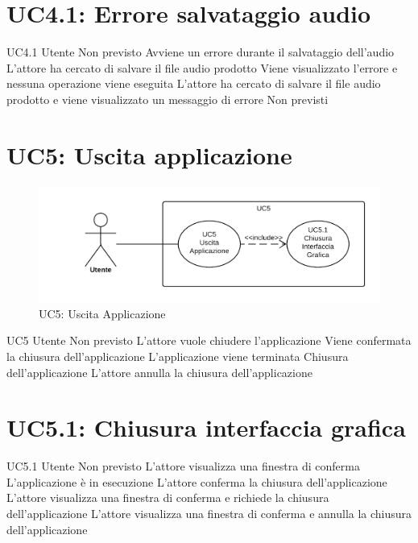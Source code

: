 \documentclass[../AnalisideiRequisiti.tex]{subfiles}
\begin{document}
\section{UC4.1: Errore salvataggio audio}
\UserCase
{UC4.1}
{Utente}
{Non previsto}
{Avviene un errore durante il salvataggio dell'audio}
{L'attore ha cercato di salvare il file audio prodotto} 
{Viene visualizzato l'errore e nessuna operazione viene eseguita}
{L'attore ha cercato di salvare il file audio prodotto e viene visualizzato un messaggio di errore}
{Non previsti}

\section{UC5: Uscita applicazione}
\begin{figure}[H]
	\centering
	\includegraphics[width=\textwidth]{../img/UC5.png}
	\caption{UC5: Uscita Applicazione}
\end{figure}
\UserCase
{UC5}
{Utente}
{Non previsto}
{L'attore vuole chiudere l'applicazione}
{Viene confermata la chiusura dell'applicazione }
{L'applicazione viene terminata}
{Chiusura dell'applicazione}
{L'attore annulla la chiusura dell'applicazione }

\section{UC5.1: Chiusura interfaccia grafica}
\UserCase
{UC5.1}
{Utente}
{Non previsto}
{L'attore visualizza una finestra di conferma}
{L'applicazione è in esecuzione}
{L'attore conferma la chiusura dell'applicazione}
{L'attore visualizza una finestra di conferma e richiede la chiusura dell'applicazione}
{L'attore visualizza una finestra di conferma e annulla la chiusura dell'applicazione}
\end{document}
